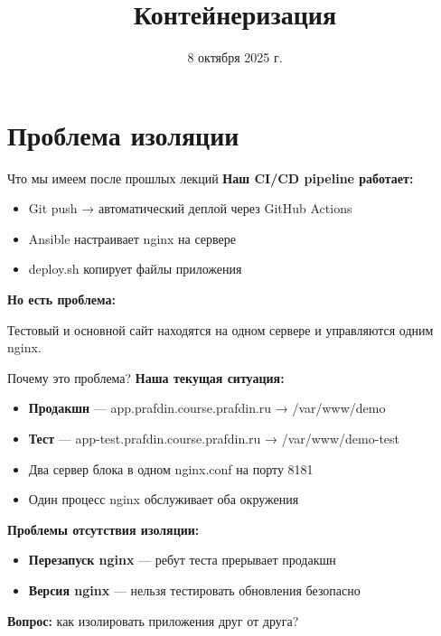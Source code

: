 \documentclass[aspectratio=169]{beamer}
\title{Контейнеризация}
\date{8 октября 2025 г.}
\begin{document}
\maketitle

\section{Проблема изоляции}

\begin{frame}{Что мы имеем после прошлых лекций}
\textbf{Наш CI/CD pipeline работает:}

\begin{itemize}
\item Git push → автоматический деплой через GitHub Actions
\item Ansible настраивает nginx на сервере
\item deploy.sh копирует файлы приложения
\end{itemize}

\textbf{Но есть проблема:}

Тестовый и основной сайт находятся на одном сервере и управляются одним nginx.
\end{frame}

\begin{frame}{Почему это проблема?}
\textbf{Наша текущая ситуация:}

\begin{itemize}
\item \textbf{Продакшн} — app.prafdin.course.prafdin.ru → /var/www/demo
\item \textbf{Тест} — app-test.prafdin.course.prafdin.ru → /var/www/demo-test
\item Два сервер блока в одном nginx.conf на порту 8181
\item Один процесс nginx обслуживает оба окружения
\end{itemize}

\vspace{0.2cm}

\textbf{Проблемы отсутствия изоляции:}
\begin{itemize}
\item \textbf{Перезапуск nginx} — ребут теста прерывает продакшн
\item \textbf{Версия nginx} — нельзя тестировать обновления безопасно
\end{itemize}

\vspace{0.2cm}

\textbf{Вопрос:} как изолировать приложения друг от друга?
\end{frame}
\end{document}
